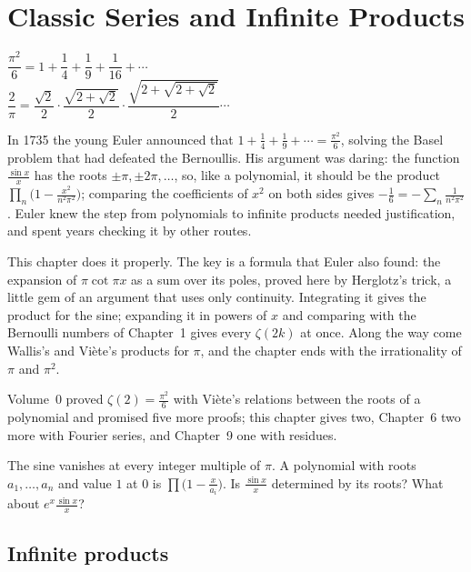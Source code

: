 \chapter{Classic Series and Infinite Products}

\begin{center}\itshape
$\dfrac{\pi^2}6=1+\dfrac14+\dfrac19+\dfrac1{16}+\cdots$\\[0.6em]
$\dfrac2\pi=\dfrac{\sqrt2}2\cdot\dfrac{\sqrt{2+\sqrt2}}2\cdot\dfrac{\sqrt{2+\sqrt{2+\sqrt2}}}2\cdots$
\end{center}

In 1735 the young Euler announced that $1+\frac14+\frac19+\cdots=\frac{\pi^2}6$, solving the Basel problem that had defeated
the Bernoullis. His argument was daring: the function $\frac{\sin x}x$ has the roots $\pm\pi,\pm2\pi,\dots$, so, like a
polynomial, it should be the product $\prod_n\bigl(1-\frac{x^2}{n^2\pi^2}\bigr)$; comparing the coefficients of $x^2$ on
both sides gives $-\frac16=-\sum_n\frac1{n^2\pi^2}$. Euler knew the step from polynomials to infinite products needed
justification, and spent years checking it by other routes.

This chapter does it properly. The key is a formula that Euler also found: the expansion of $\pi\cot\pi x$ as a sum
over its poles, proved here by Herglotz's trick, a little gem of an argument that uses only continuity. Integrating it
gives the product for the sine; expanding it in powers of $x$ and comparing with the Bernoulli numbers of Chapter~1
gives every $\zeta(2k)$ at once. Along the way come Wallis's and Vi\`ete's products for $\pi$, and the chapter ends with
the irrationality of $\pi$ and $\pi^2$.

Volume~0 proved $\zeta(2)=\frac{\pi^2}6$ with Vi\`ete's relations between the roots of a polynomial and promised five more
proofs; this chapter gives two, Chapter~6 two more with Fourier series, and Chapter~9 one with residues.

\begin{think}
The sine vanishes at every integer multiple of $\pi$. A polynomial with roots $a_1,\dots,a_n$ and value $1$ at $0$ is
$\prod\bigl(1-\frac x{a_i}\bigr)$. Is $\frac{\sin x}x$ determined by its roots? What about $e^x\frac{\sin x}x$?
\end{think}

\section{Infinite products}

